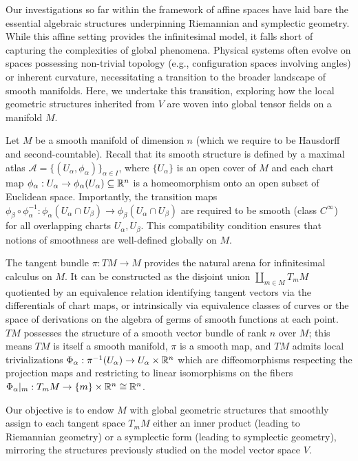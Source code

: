 Our investigations so far within the framework of affine spaces have laid bare the essential algebraic structures underpinning Riemannian and symplectic geometry. While this affine setting provides the infinitesimal model, it falls short of capturing the complexities of global phenomena. Physical systems often evolve on spaces possessing non-trivial topology (e.g., configuration spaces involving angles) or inherent curvature, necessitating a transition to the broader landscape of smooth manifolds. Here, we undertake this transition, exploring how the local geometric structures inherited from $V$ are woven into global tensor fields on a manifold $M$.

Let $M$ be a smooth manifold of dimension $n$ (which we require to be Hausdorff and second-countable). Recall that its smooth structure is defined by a maximal atlas $\mathcal{A} = \{ (U_\alpha, \phi_\alpha) \}_{\alpha \in I}$, where $\{U_\alpha\}$ is an open cover of $M$ and each chart map $\phi_\alpha: U_\alpha \to \phi_\alpha(U_\alpha) \subseteq \mathbb{R}^n$ is a homeomorphism onto an open subset of Euclidean space. Importantly, the transition maps $\phi_\beta \circ \phi_\alpha^{-1}: \phi_\alpha(U_\alpha \cap U_\beta) \to \phi_\beta(U_\alpha \cap U_\beta)$ are required to be smooth (class $C^\infty$) for all overlapping charts $U_\alpha, U_\beta$. This compatibility condition ensures that notions of smoothness are well-defined globally on $M$.

The tangent bundle $\pi: TM \to M$ provides the natural arena for infinitesimal calculus on $M$. It can be constructed as the disjoint union $\coprod_{m \in M} T_m M$ quotiented by an equivalence relation identifying tangent vectors via the differentials of chart maps, or intrinsically via equivalence classes of curves or the space of derivations on the algebra of germs of smooth functions at each point. $TM$ possesses the structure of a smooth vector bundle of rank $n$ over $M$; this means $TM$ is itself a smooth manifold, $\pi$ is a smooth map, and $TM$ admits local trivializations $\Phi_\alpha: \pi^{-1}(U_\alpha) \to U_\alpha \times \mathbb{R}^n$ which are diffeomorphisms respecting the projection maps and restricting to linear isomorphisms on the fibers $\Phi_\alpha|_m: T_m M \to \{m\} \times \mathbb{R}^n \cong \mathbb{R}^n$.

Our objective is to endow $M$ with global geometric structures that smoothly assign to each tangent space $T_m M$ either an inner product (leading to Riemannian geometry) or a symplectic form (leading to symplectic geometry), mirroring the structures previously studied on the model vector space $V$.

